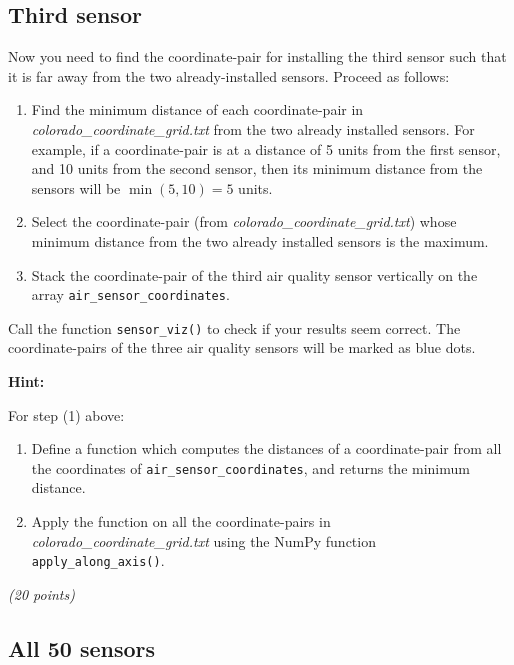 \documentclass[
  letterpaper,
  DIV=11,
  numbers=noendperiod]{scrreprt}
\begin{document}
\hypertarget{third-sensor}{%
\subsection{Third sensor}\label{third-sensor}}

Now you need to find the coordinate-pair for installing the third sensor
such that it is far away from the two already-installed sensors. Proceed
as follows:

\begin{enumerate}
\def\labelenumi{\arabic{enumi}.}
\item
  Find the minimum distance of each coordinate-pair in
  \emph{colorado\_coordinate\_grid.txt} from the two already installed
  sensors. For example, if a coordinate-pair is at a distance of 5 units
  from the first sensor, and 10 units from the second sensor, then its
  minimum distance from the sensors will be \(\min(5,10) = 5\) units.
\item
  Select the coordinate-pair (from
  \emph{colorado\_coordinate\_grid.txt}) whose minimum distance from the
  two already installed sensors is the maximum.
\item
  Stack the coordinate-pair of the third air quality sensor vertically
  on the array \texttt{air\_sensor\_coordinates}.
\end{enumerate}

Call the function \texttt{sensor\_viz()} to check if your results seem
correct. The coordinate-pairs of the three air quality sensors will be
marked as blue dots.

\textbf{Hint:}

For step (1) above:

\begin{enumerate}
\def\labelenumi{\arabic{enumi}.}
\item
  Define a function which computes the distances of a coordinate-pair
  from all the coordinates of \texttt{air\_sensor\_coordinates}, and
  returns the minimum distance.
\item
  Apply the function on all the coordinate-pairs in
  \emph{colorado\_coordinate\_grid.txt} using the NumPy function
  \texttt{apply\_along\_axis()}.
\end{enumerate}

\emph{(20 points)}

\hypertarget{all-50-sensors}{%
\subsection{All 50 sensors}\label{all-50-sensors}}
\end{document}
